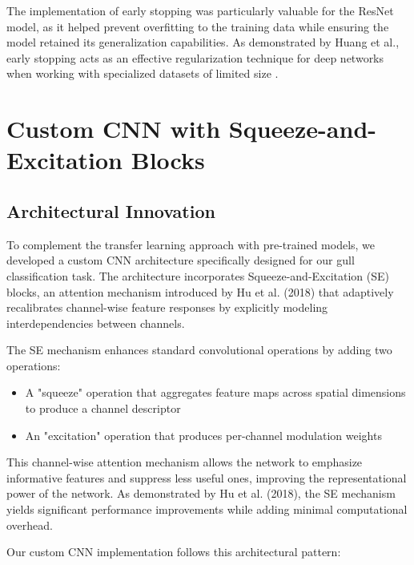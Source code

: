 \documentclass[a4paper,12pt]{article}
\begin{document}
The implementation of early stopping was particularly valuable for the ResNet model, as it helped prevent overfitting to the training data while ensuring the model retained its generalization capabilities. As demonstrated by Huang et al., early stopping acts as an effective regularization technique for deep networks when working with specialized datasets of limited size \citep{huang2022early}.





\section{Custom CNN with Squeeze-and-Excitation Blocks}

\subsection{Architectural Innovation}

To complement the transfer learning approach with pre-trained models, we developed a custom CNN architecture specifically designed for our gull classification task. The architecture incorporates Squeeze-and-Excitation (SE) blocks, an attention mechanism introduced by Hu et al. (2018) that adaptively recalibrates channel-wise feature responses by explicitly modeling interdependencies between channels.

The SE mechanism enhances standard convolutional operations by adding two operations:

\begin{itemize}
    \item A "squeeze" operation that aggregates feature maps across spatial dimensions to produce a channel descriptor
    \item An "excitation" operation that produces per-channel modulation weights
\end{itemize}

This channel-wise attention mechanism allows the network to emphasize informative features and suppress less useful ones, improving the representational power of the network. As demonstrated by Hu et al. (2018), the SE mechanism yields significant performance improvements while adding minimal computational overhead.

Our custom CNN implementation follows this architectural pattern:
\end{document}
